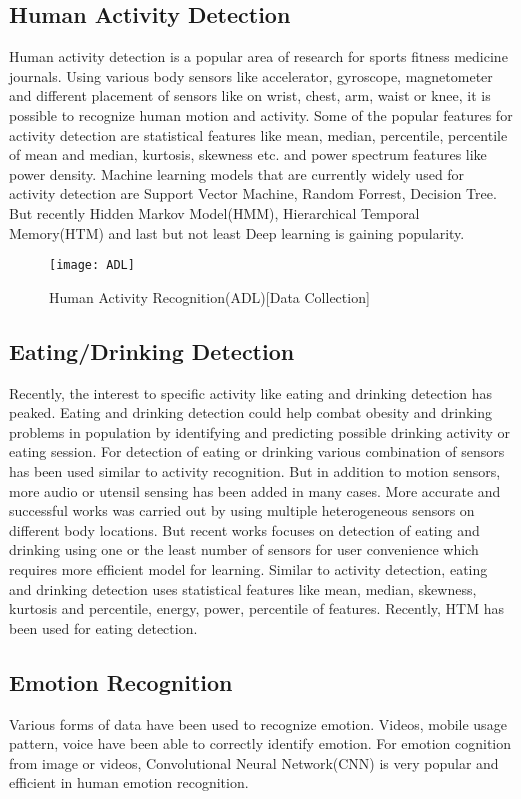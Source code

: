 \documentclass[conference]{IEEEtran}
\begin{document}
\subsection{Human Activity Detection}
Human activity detection is a popular area of research for sports fitness medicine journals. Using various body sensors like accelerator, gyroscope, magnetometer and different placement of sensors like on wrist, chest, arm, waist or knee, it is possible to recognize human motion and activity. Some of the popular features for activity detection are statistical features like mean, median, percentile, percentile of mean and median, kurtosis, skewness etc. and power spectrum features like power density. Machine learning models that are currently widely used for activity detection are Support Vector Machine, Random Forrest, Decision Tree. But recently Hidden Markov Model(HMM), Hierarchical Temporal Memory(HTM) and last but not least Deep learning is gaining popularity.
\begin{figure}[h]
\begin{center}
\texttt{[image: ADL]}
\end{center}
\caption{Human Activity Recognition(ADL)[Data Collection]}
\end{figure}
\subsection{Eating/Drinking Detection}
Recently, the interest to specific activity like eating and drinking detection has peaked. Eating and drinking detection could help combat obesity and drinking problems in population by identifying and predicting possible drinking activity or eating session. For detection of eating or drinking various combination of sensors has been used similar to activity recognition. But in addition to motion sensors, more audio or utensil sensing has been added in many cases. More accurate and successful works was carried out by using multiple heterogeneous sensors on different body locations. But recent works focuses on detection of eating and drinking using one or the least number of sensors for user convenience which requires more efficient model for learning. Similar to activity detection, eating and drinking detection uses statistical features like mean, median, skewness, kurtosis and percentile, energy, power, percentile of features. Recently, HTM has been used for eating detection.
\subsection{Emotion Recognition}
Various forms of data have been used to recognize emotion. Videos, mobile usage pattern, voice have been able to correctly identify emotion. For emotion cognition from image or videos, Convolutional Neural Network(CNN) is very popular and efficient in human emotion recognition.
\end{document}
